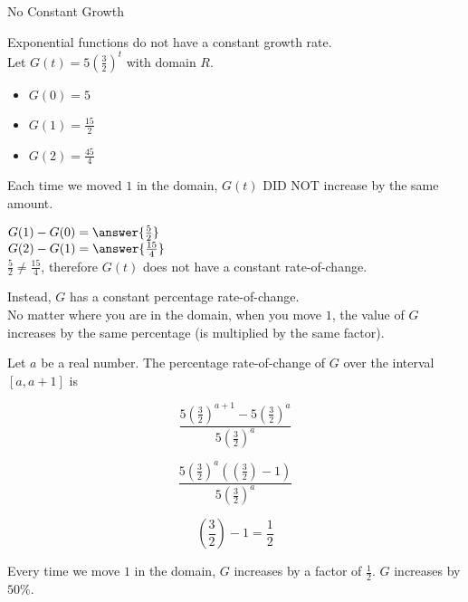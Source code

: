 \documentclass{ximera}
\begin{document}
\begin{fact}  No Constant Growth



Exponential functions do not have a constant growth rate. \\


Let $G(t) = 5 \left(\frac{3}{2}\right)^t$ with domain \textbf{$R$}. 






\begin{itemize}
\item $G(0) = 5$
\item $G(1) = \frac{15}{2}$
\item $G(2) = \frac{45}{4}$
\end{itemize}



Each time we moved $1$ in the domain, $G(t)$ DID NOT increase by the same amount.

$G(1) - G(0) = \answer{\frac{5}{2}}$ \\

$G(2) - G(1) = \answer{\frac{15}{4}}$ \\

$ \frac{5}{2}  \ne  \frac{15}{4} $, therefore $G(t)$ does not have a constant rate-of-change. \\

\end{fact}




Instead, $G$ has a constant percentage rate-of-change. \\

No matter where you are in the domain, when you move $1$, the value of $G$ increases by the same percentage (is multiplied by the same factor).


Let $a$ be a real number.  The percentage rate-of-change of $G$ over the interval $[a,a+1]$ is 



\[    \frac{5 \left(\frac{3}{2}\right)^{a+1} - 5 \left(\frac{3}{2}\right)^a}{5 \left(\frac{3}{2}\right)^a}       \]


\[   \frac{5 \left(\frac{3}{2}\right)^a (\left(\frac{3}{2}\right) - 1) }{5 \left(\frac{3}{2}\right)^a}    \]


\[   \left(\frac{3}{2}\right) - 1 = \frac{1}{2}   \]

Every time we move $1$ in the domain, $G$ increases by a factor of $\frac{1}{2}$.  $G$ increases by $50\%$.
\end{document}
